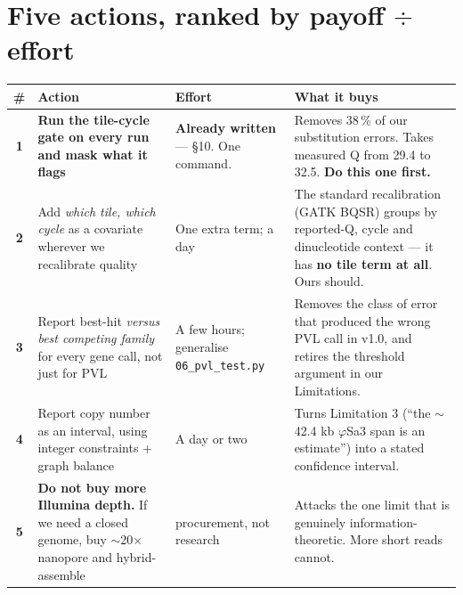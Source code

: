 \clearpage
\renewcommand{\sectioncolor}{bio}
\section{Five actions, ranked by payoff $\div$ effort}

\begin{center}\small
\begin{tabular}{@{}c>{\raggedright\arraybackslash}p{5.0cm}>{\raggedright\arraybackslash}p{4.3cm}>{\raggedright\arraybackslash}p{5.2cm}@{}}
\toprule
\rowcolor{bio!14}
\textbf{\#} & \textbf{\color{bio}Action} & \textbf{\color{bio}Effort} & \textbf{\color{bio}What it buys}\\
\midrule
\rowcolor{bio!7}
\textbf{1} & \textbf{Run the tile-cycle gate on every run and mask what it flags} &
 \textbf{Already written} --- \S10. One command. & Removes 38\,\% of our substitution errors. Takes
 measured Q from 29.4 to 32.5. \textbf{Do this one first.}\\
\textbf{2} & Add \emph{which tile, which cycle} as a covariate wherever we recalibrate quality &
 One extra term; a day &
 The standard recalibration (GATK BQSR) groups by reported-Q, cycle and dinucleotide context --- it
 has \textbf{no tile term at all}. Ours should.\\
\textbf{3} & Report best-hit \emph{versus best competing family} for every gene call, not just for PVL &
 A few hours; generalise \texttt{06\_pvl\_test.py} &
 Removes the class of error that produced the wrong PVL call in v1.0, and retires the threshold
 argument in our Limitations.\\
\textbf{4} & Report copy number as an interval, using integer constraints + graph balance &
 A day or two &
 Turns Limitation 3 (``the $\sim$42.4 kb $\varphi$Sa3 span is an estimate'') into a stated confidence
 interval.\\
\rowcolor{alert!7}
\textbf{5} & \textbf{Do not buy more Illumina depth.} If we need a closed genome, buy $\sim$20$\times$
 nanopore and hybrid-assemble & procurement, not research &
 Attacks the one limit that is genuinely information-theoretic. More short reads cannot.\\
\bottomrule
\end{tabular}
\end{center}


